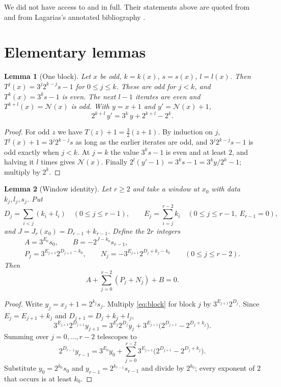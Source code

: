 \documentclass[11pt]{amsart}
\newtheorem{lemma}{Lemma}
\theoremstyle{remark}
\newcommand{\N}{\mathcal{N}}
\begin{document}
We did not have access to \cite{Brox} and \cite{Luca} in full. Their statements above are
quoted from \cite{SdW} and from Lagarias's annotated bibliography \cite{Lagarias}.

\section{Elementary lemmas}

\begin{lemma}[One block]\label{lem:block}
Let $x$ be odd, $k=k(x)$, $s=s(x)$, $l=l(x)$. Then $T^j(x)=3^j2^{k-j}s-1$ for $0\le j\le k$.
These are odd for $j<k$, and $T^k(x)=3^ks-1$ is even. The next $l-1$ iterates are even and
$T^{k+l}(x)=\N(x)$ is odd. With $y=x+1$ and $y'=\N(x)+1$,
\begin{equation}\label{eq:block}
2^{k+l}\,y' = 3^k\,y + 2^{k+l}-2^k .
\end{equation}
\end{lemma}

\begin{proof}
For odd $z$ we have $T(z)+1=\tfrac32(z+1)$. By induction on $j$,
$T^j(x)+1=3^j2^{k-j}s$ as long as the earlier iterates are odd, and $3^j2^{k-j}s-1$ is odd
exactly when $j<k$. At $j=k$ the value $3^ks-1$ is even and at least $2$, and halving it $l$
times gives $\N(x)$. Finally $2^l(y'-1)=3^ks-1=3^ky/2^k-1$; multiply by $2^k$.
\end{proof}

\begin{lemma}[Window identity]\label{lem:identity}
Let $r\ge 2$ and take a window at $x_0$ with data $k_j,l_j,s_j$. Put
\[
D_j=\sum_{i<j}(k_i+l_i)\quad(0\le j\le r-1),\qquad
E_j=\sum_{i=j}^{r-2}k_i\quad(0\le j\le r-1,\ E_{r-1}=0),
\]
and $J=J_r(x_0)=D_{r-1}+k_{r-1}$. Define the $2r$ integers
\begin{gather*}
A=3^{E_0}s_0,\qquad B=-2^{J-k_0}s_{r-1},\\
P_j=3^{E_{j+1}}2^{D_{j+1}-k_0},\qquad
N_j=-3^{E_{j+1}}2^{D_j+k_j-k_0}\qquad(0\le j\le r-2).
\end{gather*}
Then
\[
A+\sum_{j=0}^{r-2}(P_j+N_j)+B=0 .
\]
\end{lemma}

\begin{proof}
Write $y_j=x_j+1=2^{k_j}s_j$. Multiply \eqref{eq:block} for block $j$ by
$3^{E_{j+1}}2^{D_j}$. Since $E_j=E_{j+1}+k_j$ and $D_{j+1}=D_j+k_j+l_j$,
\[
3^{E_{j+1}}2^{D_{j+1}}y_{j+1}=3^{E_j}2^{D_j}y_j+3^{E_{j+1}}\bigl(2^{D_{j+1}}-2^{D_j+k_j}\bigr).
\]
Summing over $j=0,\dots,r-2$ telescopes to
\[
2^{D_{r-1}}y_{r-1}=3^{E_0}y_0+\sum_{j=0}^{r-2}3^{E_{j+1}}\bigl(2^{D_{j+1}}-2^{D_j+k_j}\bigr).
\]
Substitute $y_0=2^{k_0}s_0$ and $y_{r-1}=2^{k_{r-1}}s_{r-1}$ and divide by $2^{k_0}$; every
exponent of $2$ that occurs is at least $k_0$.
\end{proof}
\end{document}

